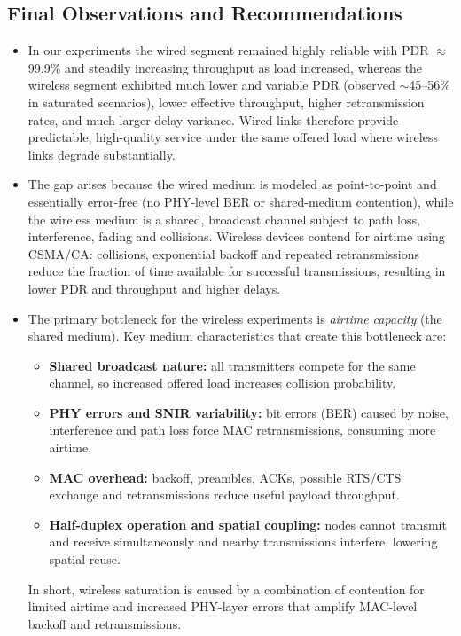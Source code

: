 \documentclass{rapport}
\begin{document}
\subsection{Final Observations and Recommendations}
\begin{itemize}
  \item  In our experiments the wired segment remained highly reliable with PDR $\approx$ 99.9\% and steadily increasing throughput as load increased, whereas the wireless segment exhibited much lower and variable PDR (observed $\sim$45--56\% in saturated scenarios), lower effective throughput, higher retransmission rates, and much larger delay variance.  Wired links therefore provide predictable, high-quality service under the same offered load where wireless links degrade substantially.
  \item The gap arises because the wired medium is modeled as point-to-point and essentially error-free (no PHY-level BER or shared-medium contention), while the wireless medium is a shared, broadcast channel subject to path loss, interference, fading and collisions. Wireless devices contend for airtime using CSMA/CA: collisions, exponential backoff and repeated retransmissions reduce the fraction of time available for successful transmissions, resulting in lower PDR and throughput and higher delays.
  \item The primary bottleneck for the wireless experiments is \emph{airtime capacity} (the shared medium). Key medium characteristics that create this bottleneck are:
    \begin{itemize}
      \item \textbf{Shared broadcast nature:} all transmitters compete for the same channel, so increased offered load increases collision probability.
      \item \textbf{PHY errors and SNIR variability:} bit errors (BER) caused by noise, interference and path loss force MAC retransmissions, consuming more airtime.
      \item \textbf{MAC overhead:} backoff, preambles, ACKs, possible RTS/CTS exchange and retransmissions reduce useful payload throughput.
      \item \textbf{Half-duplex operation and spatial coupling:} nodes cannot transmit and receive simultaneously and nearby transmissions interfere, lowering spatial reuse.
    \end{itemize}
    In short, wireless saturation is caused by a combination of contention for limited airtime and increased PHY-layer errors that amplify MAC-level backoff and retransmissions.

\end{itemize}
\end{document}

